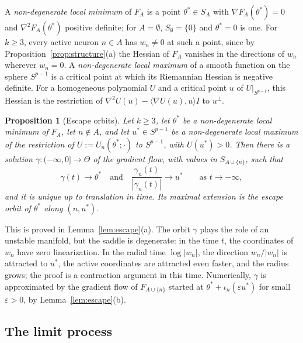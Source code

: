 \documentclass[11pt]{article}
\newtheorem{proposition}[theorem]{Proposition}
\theoremstyle{definition}
\theoremstyle{remark}
\numberwithin{equation}{section}
\newcommand{\eps}{\varepsilon}
\newcommand{\ip}[2]{\langle #1,#2\rangle}
\begin{document}
A \emph{non-degenerate local minimum} of $F_A$ is a point $\theta^*\in S_A$ with $\nabla F_A(\theta^*)=0$ and $\nabla^2F_A(\theta^*)$ positive definite; for $A=\emptyset$, $S_\emptyset=\{0\}$ and $\theta^*=0$ is one. For $k\ge3$, every active neuron $n\in A$ has $w_n\neq0$ at such a point, since by Proposition~\ref{prop:structure}(a) the Hessian of $F_A$ vanishes in the directions of $w_n$ wherever $w_n=0$. A \emph{non-degenerate local maximum} of a smooth function on the sphere $S^{p-1}$ is a critical point at which its Riemannian Hessian is negative definite. For a homogeneous polynomial $U$ and a critical point $u$ of $U|_{S^{p-1}}$, this Hessian is the restriction of $\nabla^2U(u)-\ip{\nabla U(u)}{u}I$ to $u^\perp$.

\begin{proposition}[Escape orbits]\label{prop:escape}
Let $k\ge3$, let $\theta^*$ be a non-degenerate local minimum of $F_A$, let $n\notin A$, and let $u^*\in S^{p-1}$ be a non-degenerate local maximum of the restriction of $U:=U_n(\theta^*;\cdot)$ to $S^{p-1}$, with $U(u^*)>0$. Then there is a solution $\gamma\colon(-\infty,0]\to\Theta$ of the gradient flow, with values in $S_{A\cup\{n\}}$, such that
\[
\gamma(t)\to\theta^*\quad\text{and}\quad \frac{\gamma_n(t)}{|\gamma_n(t)|}\to u^*\qquad\text{as }t\to-\infty,
\]
and it is unique up to translation in time. Its maximal extension is the \emph{escape orbit} of $\theta^*$ along $(n,u^*)$.
\end{proposition}

This is proved in Lemma~\ref{lem:escape}(a). The orbit $\gamma$ plays the role of an unstable manifold, but the saddle is degenerate: in the time $t$, the coordinates of $w_n$ have zero linearization. In the radial time $\log|w_n|$, the direction $w_n/|w_n|$ is attracted to $u^*$, the active coordinates are attracted even faster, and the radius grows; the proof is a contraction argument in this time. Numerically, $\gamma$ is approximated by the gradient flow of $F_{A\cup\{n\}}$ started at $\theta^*+\iota_n(\eps u^*)$ for small $\eps>0$, by Lemma~\ref{lem:escape}(b).

\subsection{The limit process}
\end{document}
